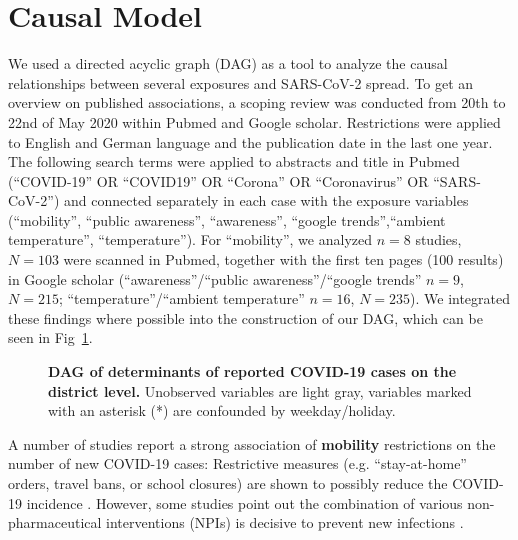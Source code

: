 \documentclass[10pt,letterpaper]{article}
\begin{document}
\section*{Causal Model}\label{causal-model}

We used a directed acyclic graph (DAG)
\cite{schipf_directed_2011, textor_robust_2017} as a tool to analyze
the causal relationships between several exposures and SARS-CoV-2
spread. To get an overview on published associations, a scoping review
was conducted from 20th to 22nd of May 2020 within Pubmed and Google
scholar. Restrictions were applied to English and German language and
the publication date in the last one year. The following search terms
were applied to abstracts and title in Pubmed (``COVID-19'' OR
``COVID19'' OR ``Corona'' OR ``Coronavirus'' OR ``SARS-CoV-2'') and
connected separately in each case with the exposure variables
(``mobility'', ``public awareness'', ``awareness'', ``google
trends'',``ambient temperature'', ``temperature''). For ``mobility'', we
analyzed \(n=8\) studies, \(N=103\) were scanned in Pubmed, together
with the first ten pages (100 results) in Google scholar
(``awareness''/``public awareness''/``google trends'' \(n=9\),
\(N=215\); ``temperature''/``ambient temperature'' \(n=16\), \(N=235\)).
We integrated these findings where possible into the construction of our
DAG, which can be seen in Fig~\ref{fig:dag-covid-19}.


\begin{figure}[!h]
\caption{{\bf DAG of determinants of reported COVID-19 cases on the district level.}
Unobserved variables are light gray, variables marked with an asterisk (*) are confounded by weekday/holiday.}
\label{fig:dag-covid-19}
\end{figure}

A number of studies report a strong association of \textbf{mobility}
restrictions on the number of new COVID-19 cases: Restrictive measures
(e.g. ``stay-at-home'' orders, travel bans, or school closures) are
shown to possibly reduce the COVID-19 incidence
\cite{chang_modeling_2020, Chinazzi395, fowler_effect_2020, kraemer_effect_2020, lasry_timing_2020, linka_outbreak_2020, mazzoli_effects_2020, xiong_data-driven_2020}.
However, some studies point out the combination of various
non-pharmaceutical interventions (NPIs) is decisive to prevent new
infections \cite{juni_impact_2020, lai_effect_2020}.
\end{document}
